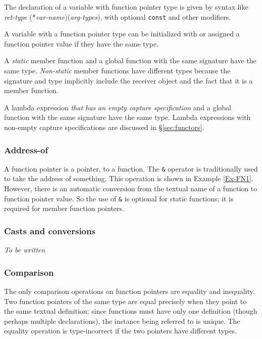 The declaration of a variable with function pointer type is given by syntax like\\
\emph{ret-type} (*\emph{var-name})(\emph{arg-types}), with optional \lstinline|const| and other modifiers.

A variable with a function pointer type can be initialized with or assigned a function pointer value if they have the same type.

A \emph{static} member function and
a global function with the same signature have the same type.
\emph{Non-static} member functions have different types because
the signature and type implicitly include the receiver object
and the fact that it is a member function.

A lambda expression \emph{that has an empty capture specification} and
a global function with the same signature have the same type.
Lambda expressions with non-empty capture specifications are discussed 
in \S\ref{sec:functors}.

\subsubsection{Address-of}

A function pointer is a pointer, to a function. 
The \lstinline|&| operator is traditionally used to take
the address of something. 
This operation is shown in Example \ref{Ex-FN1}.
However, there is an automatic conversion from the textual
name of a function to function pointer value. 
So the use of \lstinline|&| is optional for static functions; it is required for member function pointers.

\subsubsection{Casts and conversions}

\textit{To be written}

\subsubsection{Comparison}

The only comparison operations on function pointers are 
equality and inequality. Two function pointers of the 
same type are equal precisely when they point to the same
textual definition; since functions must have only one
definition (though perhaps multiple declarations), 
the instance being referred to is unique. 
The equality operation is type-incorrect if the two
pointers have different types.

